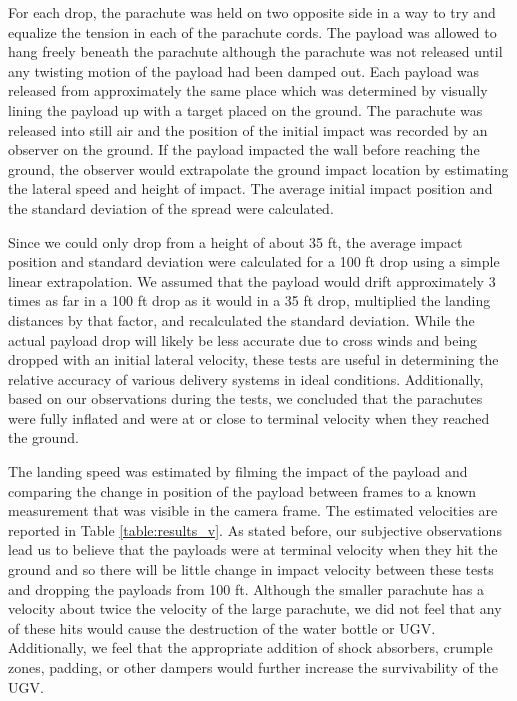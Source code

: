 \documentclass[]{auvsi_doc}
\begin{document}
For each drop, the parachute was held on two opposite side in a way to try and equalize the tension in each of the parachute cords. The payload was allowed to hang freely beneath the parachute although the parachute was not released until any twisting motion of the payload had been damped out. Each payload was released from approximately the same place which was determined by visually lining the payload up with a target placed on the ground. The parachute was released into still air and the position of the initial impact was recorded by an observer on the ground. If the payload impacted the wall before reaching the ground, the observer would extrapolate the ground impact location by estimating the lateral speed and height of impact. The average initial impact position and the standard deviation of the spread were calculated. 

Since we could only drop from a height of about 35 ft, the average impact position and standard deviation were calculated for a 100 ft drop using a simple linear extrapolation. We assumed that the payload would drift approximately 3 times as far in a 100 ft drop as it would in a 35 ft drop,  multiplied the landing distances by that factor, and recalculated the standard deviation. While the actual payload drop will likely be less accurate due to cross winds and being dropped with an initial lateral velocity, these tests are useful in determining the relative accuracy of various delivery systems in ideal conditions. Additionally, based on our observations during the tests, we concluded that the parachutes were fully inflated and were at or close to terminal velocity when they reached the ground. 

The landing speed was estimated by filming the impact of the payload and comparing the change in position of the payload between frames to a known measurement that was visible in the camera frame. The estimated velocities are reported in Table \ref{table:results_v}. As stated before, our subjective observations lead us to believe that the payloads were at terminal velocity when they hit the ground and so there will be little change in impact velocity between these tests and dropping the payloads from 100 ft. Although the smaller parachute has a velocity about twice the velocity of the large parachute, we did not feel that any of these hits would cause the destruction of the water bottle or UGV. Additionally, we feel that the appropriate addition of shock absorbers, crumple zones, padding, or other dampers would further increase the survivability of the UGV.
\end{document}
